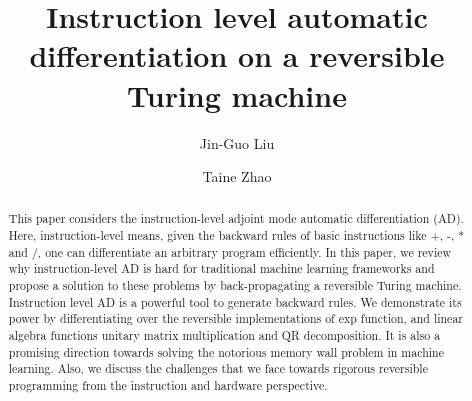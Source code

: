 \documentclass[aps,twocolumn,longbibliography,english,superscriptaddress]{revtex4-1}
\newcommand{\<}{\langle}
\renewcommand{\>}{\rangle}
\theoremstyle{definition}\newtheorem{definition}{\textit{Definition}}
\begin{document}
\title{Instruction level automatic differentiation on a reversible Turing machine}


\author{Jin-Guo Liu}

\author{Taine Zhao}

\begin{abstract}
    This paper considers the instruction-level adjoint mode automatic differentiation (AD). Here, instruction-level means, given the backward rules of basic instructions like +, -, * and /, one can differentiate an arbitrary program efficiently. In this paper, we review why instruction-level AD is hard for traditional machine learning frameworks and propose a solution to these problems by back-propagating a reversible Turing machine.
    Instruction level AD is a powerful tool to generate backward rules. We demonstrate its power by differentiating over the reversible implementations of $\mathrm{exp}$ function, and linear algebra functions unitary matrix multiplication and QR decomposition. It is also a promising direction towards solving the notorious memory wall problem in machine learning. Also, we discuss the challenges that we face towards rigorous reversible programming from the instruction and hardware perspective.
\end{abstract}


\maketitle

\end{document}
